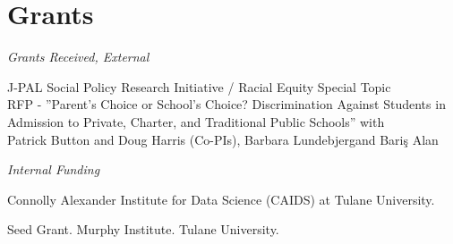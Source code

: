 \documentclass[letterpaper]{article}
\renewenvironment{itemize}{
  \begin{list}{}{
    \setlength{\leftmargin}{1.5em}
  }
}{
  \end{list}
}
\begin{document}
\printbibliography[heading=cvsection, title={Publications},        keyword=published]
\vspace{2 mm}

\printbibliography[heading=cvsection, title={Revise and Resubmit}, keyword=rr]
\vspace{2 mm}

\printbibliography[heading=cvsection, title={Working Papers},      keyword=wp]
\vspace{2 mm}

\printbibliography[heading=cvsection, title={Works in Progress},   keyword=wip]


\section*{Grants}

\vspace{2 mm}
\textit{Grants Received, External} \\
\begin{itemize}
  \item {} {}J-PAL Social Policy Research Initiative / Racial Equity Special Topic \\{\makebox[17mm]{\hfill}} RFP - ”Parent’s Choice or School’s Choice? Discrimination Against Students in \\{\makebox[17mm]{\hfill}} Admission to Private, Charter, and Traditional Public Schools” with \\{\makebox[17mm]{\hfill}} Patrick Button and Doug Harris (Co-PIs), Barbara Lundebjerg\student and Bariş Alan\student
\end{itemize}

\vspace{2 mm}
\textit{Internal Funding} \\
\begin{itemize}
  \item {} {}Connolly Alexander Institute for Data Science (CAIDS) at Tulane University.
\end{itemize}
\vspace{2 mm}
\begin{itemize}
  \item {} {}Seed Grant. Murphy Institute. Tulane University.
\end{itemize}
\studentnote
\end{document}
